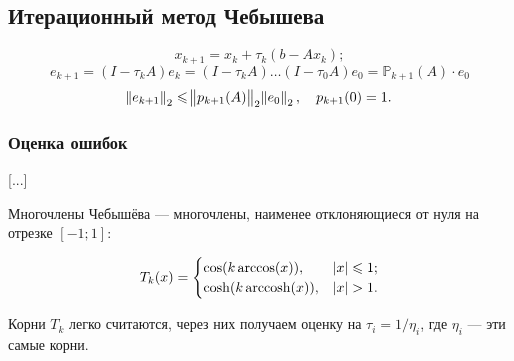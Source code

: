 \subsection{Итерационный метод Чебышева}

\[
    x_{k + 1} = x_k + \tau_k (b - A x_k);
\]
\[
    e_{k + 1} = (I - \tau_k A) e_k = (I - \tau_k A) \dots (I - \tau_0 A) e_0
    = \mathbb{P}_{k + 1}(A) \cdot e_0
\]
\[
    \norm{e_{k + 1}}_2 \leqslant \norm{p_{k + 1}(A)}_2 \norm{e_0}_2,
    \quad p_{k + 1}(0) = 1.
\]

\subsubsection{Оценка ошибок}

[...]

Многочлены Чебышёва --- многочлены, наименее отклоняющиеся от нуля на отрезке
$[-1; 1]$:

\[
    T_k(x) = \begin{cases}
        \cos(k \arccos(x)), & |x| \leqslant 1; \\
        \cosh(k \operatorname{arccosh}(x)), & |x| > 1.
    \end{cases}
\]

Корни $T_k$ легко считаются, через них получаем оценку на $\tau_i = 1 / \eta_i$,
где $\eta_i$ --- эти самые корни.
